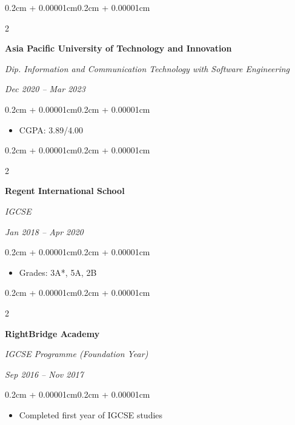 \documentclass[10pt, letterpaper]{article}
\newenvironment{highlights}{
    \begin{itemize}[
        topsep=0.10cm,
        parsep=0.10cm,
        partopsep=0pt,
        itemsep=0pt,
        leftmargin=0.4cm + 10pt
    ]
}{
    \end{itemize}
}
\newenvironment{onecolentry}{
    \begin{adjustwidth}{0.2cm + 0.00001cm}{0.2cm + 0.00001cm}
}{
    \end{adjustwidth}
}
\newenvironment{twocolentry}[2][]{
    \onecolentry
    \def\secondColumn{#2}
    \setcolumnwidth{\fill, 5.2cm}
    \begin{paracol}{2}
}{
    \switchcolumn \raggedleft \secondColumn
    \end{paracol}
    \endonecolentry
}
\newenvironment{projectentry}{
    \needspace{2.5\baselineskip}
}{
}
\begin{document}
    \begin{projectentry}
    \begin{twocolentry}{
        \textit{Dec 2020 -- Mar 2023}
    }
        \textbf{Asia Pacific University of Technology and Innovation}

        \textit{Dip. Information and Communication Technology with Software Engineering}
    \end{twocolentry}
    \vspace{0.10cm}
    \begin{onecolentry}
        \begin{highlights}
            \item CGPA: 3.89/4.00
        \end{highlights}
    \end{onecolentry}
    \end{projectentry}

    \vspace{0.2cm}

    \begin{projectentry}
    \begin{twocolentry}{
        \textit{Jan 2018 -- Apr 2020}
    }
        \textbf{Regent International School}

        \textit{IGCSE}
    \end{twocolentry}
    \vspace{0.10cm}
    \begin{onecolentry}
        \begin{highlights}
            \item Grades: 3A*, 5A, 2B
        \end{highlights}
    \end{onecolentry}
    \end{projectentry}

    \vspace{0.2cm}

    \begin{projectentry}
    \begin{twocolentry}{
        \textit{Sep 2016 -- Nov 2017}
    }
        \textbf{RightBridge Academy}

        \textit{IGCSE Programme (Foundation Year)}
    \end{twocolentry}
    \vspace{0.10cm}
    \begin{onecolentry}
        \begin{highlights}
            \item Completed first year of IGCSE studies
        \end{highlights}
    \end{onecolentry}
    \end{projectentry}
    
\end{document}

